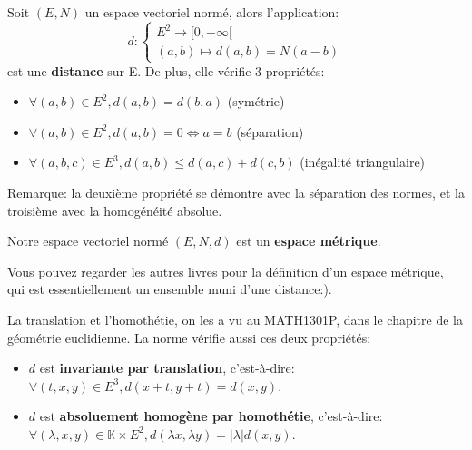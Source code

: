 \documentclass{article}
\begin{document}
\begin{tcolorbox}[colback=red!5!white,colframe=red!75!black,title=Définition 1.3]

Soit $(E,N)$ un espace vectoriel normé, alors l'application:
\[
d : 
\begin{cases} 
E^{2} \to [ 0, +\infty [ \\
(a,b) \mapsto d(a,b) = N(a-b)
\end{cases}
\]
est une \textbf{distance} sur E. De plus, elle vérifie 3 propriétés:


\begin{itemize}
 \item $\forall (a,b)\in E^{2}, d(a,b) = d(b,a)$ \hfill (symétrie)
 \item $\forall (a,b)\in E^{2}, d(a,b) = 0 \Longleftrightarrow a=b$ \hfill (séparation)
 \item $\forall (a,b,c) \in E^{3}, d(a,b) \leq d(a,c) + d(c,b)$ \hfill (inégalité triangulaire)
\end{itemize}

\tcblower

Remarque: la deuxième propriété se démontre avec la séparation des normes, et la troisième avec la homogénéité absolue.



\end{tcolorbox}

\begin{tcolorbox}[colback=blue!5!white,colframe=blue!75!black,title=Propriété 1.1]

Notre espace vectoriel normé $(E,N,d)$ est un \textbf{espace métrique}.

\tcblower
Vous pouvez regarder les autres livres pour la définition d'un espace métrique, qui est essentiellement un ensemble muni d'une distance:).
\end{tcolorbox}






\begin{tcolorbox}[colback=blue!5!white,colframe=blue!75!black,title=Propriété 1.2]

La translation et l'homothétie, on les a vu au MATH1301P, dans le chapitre de la géométrie euclidienne. La norme vérifie aussi ces deux propriétés:

\begin{itemize}
 \item $d$ est \textbf{invariante par translation}, c'est-à-dire: $\forall(t,x,y)\in E^{3}, d(x+t, y+t) = d(x,y)$.
 \item $d$ est \textbf{absoluement homogène par homothétie}, c'est-à-dire: $\forall(\lambda, x, y) \in \mathbb{K} \times E^{2}, d(\lambda x, \lambda y) = |\lambda|d(x,y)$.
\end{itemize}

\end{tcolorbox}
\end{document}

